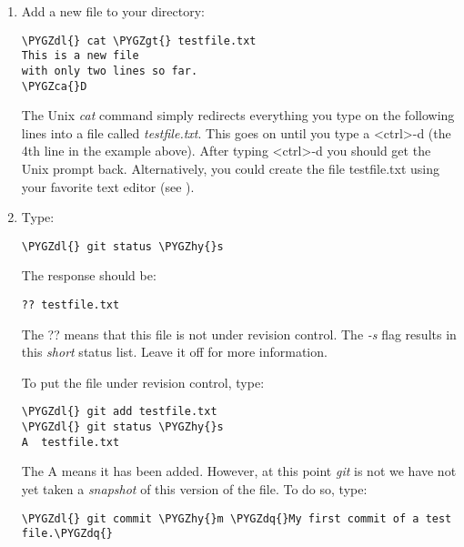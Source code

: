 \documentclass[letterpaper,10pt,english]{sphinxmanual}
\def\PYGZca{\char`\^}
\def\PYGZgt{\char`\>}
\def\PYGZdl{\char`\$}
\def\PYGZhy{\char`\-}
\def\PYGZdq{\char`\"}
\begin{document}
\begin{enumerate}
\item {} 
Add a new file to your directory:

\begin{Verbatim}[commandchars=\\\{\}]
\PYGZdl{} cat \PYGZgt{} testfile.txt
This is a new file
with only two lines so far.
\PYGZca{}D
\end{Verbatim}

The Unix \emph{cat} command simply redirects everything you type on the
following lines into a file called \emph{testfile.txt}.  This goes on until
you type a \textless{}ctrl\textgreater{}-d (the 4th line in the example
above).  After typing \textless{}ctrl\textgreater{}-d you should get the Unix
prompt back.  Alternatively, you could create the file testfile.txt using
your favorite text editor (see {\hyperref[editors:editors]{}}).

\item {} 
Type:

\begin{Verbatim}[commandchars=\\\{\}]
\PYGZdl{} git status \PYGZhy{}s
\end{Verbatim}

The response should be:

\begin{Verbatim}[commandchars=\\\{\}]
?? testfile.txt
\end{Verbatim}

The ?? means that this file is not under revision control.
The \emph{-s} flag results in this \emph{short} status list.  Leave it off for more
information.

To put the file under revision control, type:

\begin{Verbatim}[commandchars=\\\{\}]
\PYGZdl{} git add testfile.txt
\PYGZdl{} git status \PYGZhy{}s
A  testfile.txt
\end{Verbatim}

The A means it has been added.  However, at this point \emph{git} is not
we have not yet taken a \emph{snapshot} of this version of the file.
To do so, type:

\begin{Verbatim}[commandchars=\\\{\}]
\PYGZdl{} git commit \PYGZhy{}m \PYGZdq{}My first commit of a test file.\PYGZdq{}
\end{Verbatim}


\end{enumerate}
\end{document}
